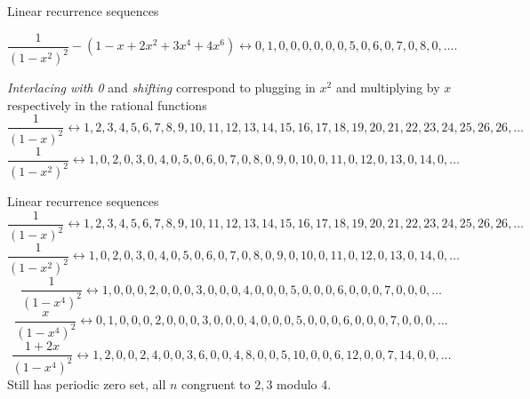 \documentclass[notheorems]{beamer}
\theoremstyle{plain}
\begin{document}
\begin{frame}{Linear recurrence sequences}
    \begin{example}{}{}
        \begin{equation*}
            \frac{1}{(1-x^2)^2} - (1 - x + 2x^2 + 3x^4 + 4x^6)
            \leftrightarrow 0,1,0,0,0,0,0,0,5,0,6,0,7,0,8,0,\ldots\text{.}
        \end{equation*}
        \pause
    \end{example}
    \emph{Interlacing with 0} and \emph{shifting} correspond to plugging in \(x^2\) and multiplying by \(x\) respectively in the rational functions
    \pause
    \begin{equation*}
        \frac{1}{(1-x)^2} \leftrightarrow 1,2,3,4,5,6,7,8,9,10,11,12,13,14,15,16,17,18,19,20,21,22,23,24,25,26,26,\ldots
    \end{equation*}
    \pause
    \begin{equation*}
        \frac{1}{(1-x^2)^2} \leftrightarrow 1,0,2,0,3,0,4,0,5,0,6,0,7,0,8,0,9,0,10,0,11,0,12,0,13,0,14,0,\ldots
    \end{equation*}
\end{frame}

\begin{frame}{Linear recurrence sequences}
    \begin{equation*}
        \frac{1}{(1-x)^2} \leftrightarrow 1,2,3,4,5,6,7,8,9,10,11,12,13,14,15,16,17,18,19,20,21,22,23,24,25,26,26,\ldots
    \end{equation*}
    \begin{equation*}
        \frac{1}{(1-x^2)^2} \leftrightarrow 1,0,2,0,3,0,4,0,5,0,6,0,7,0,8,0,9,0,10,0,11,0,12,0,13,0,14,0,\ldots
    \end{equation*}
    \begin{equation*}
        \frac{1}{(1-x^4)^2} \leftrightarrow 1,0,0,0,2,0,0,0,3,0,0,0,4,0,0,0,5,0,0,0,6,0,0,0,7,0,0,0,\ldots
    \end{equation*}
    \pause
    \begin{equation*}
        \frac{x}{(1-x^4)^2} \leftrightarrow 0,1,0,0,0,2,0,0,0,3,0,0,0,4,0,0,0,5,0,0,0,6,0,0,0,7,0,0,0,\ldots
    \end{equation*}
    \pause
    \begin{equation*}
        \frac{1+2x}{(1-x^4)^2} \leftrightarrow 1,2,0,0,2,4,0,0,3,6,0,0,4,8,0,0,5,10,0,0,6,12,0,0,7,14,0,0,\ldots
    \end{equation*}
    \pause
    Still has periodic zero set, all \(n\) congruent to \(2,3\) modulo 4.%
    \par
\end{frame}
\end{document}
